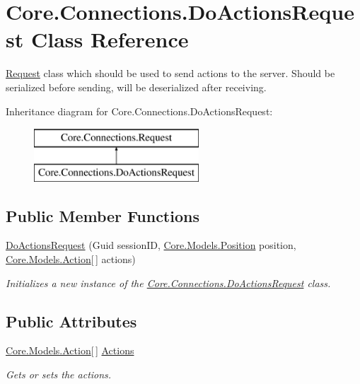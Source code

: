 \hypertarget{classCore_1_1Connections_1_1DoActionsRequest}{}\section{Core.\+Connections.\+Do\+Actions\+Request Class Reference}
\label{classCore_1_1Connections_1_1DoActionsRequest}


\hyperlink{classCore_1_1Connections_1_1Request}{Request} class which should be used to send actions to the server. Should be serialized before sending, will be deserialized after receiving.  


Inheritance diagram for Core.\+Connections.\+Do\+Actions\+Request\+:\begin{figure}[H]
\begin{center}
\leavevmode
\includegraphics[height=2.000000cm]{classCore_1_1Connections_1_1DoActionsRequest}
\end{center}
\end{figure}
\subsection*{Public Member Functions}
\begin{DoxyCompactItemize}
\item 
\hyperlink{classCore_1_1Connections_1_1DoActionsRequest_a1298901ab5ab91c539caa9d5cb9115e2}{Do\+Actions\+Request} (Guid session\+I\+D, \hyperlink{classCore_1_1Models_1_1Position}{Core.\+Models.\+Position} position, \hyperlink{classCore_1_1Models_1_1Action}{Core.\+Models.\+Action}\mbox{[}$\,$\mbox{]} actions)
\begin{DoxyCompactList}\small\item\em Initializes a new instance of the \hyperlink{classCore_1_1Connections_1_1DoActionsRequest}{Core.\+Connections.\+Do\+Actions\+Request} class. \end{DoxyCompactList}\end{DoxyCompactItemize}
\subsection*{Public Attributes}
\begin{DoxyCompactItemize}
\item 
\hyperlink{classCore_1_1Models_1_1Action}{Core.\+Models.\+Action}\mbox{[}$\,$\mbox{]} \hyperlink{classCore_1_1Connections_1_1DoActionsRequest_a25fbe4ad38c5390024d7cb616507957c}{Actions}
\begin{DoxyCompactList}\small\item\em Gets or sets the actions. \end{DoxyCompactList}\end{DoxyCompactItemize}


